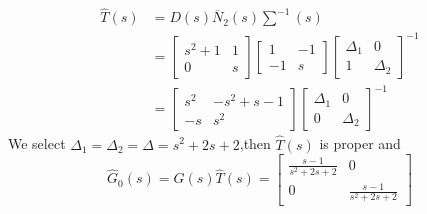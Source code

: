 \documentclass{article}
\begin{document}
\[
\begin{split}
\hat{T}(s)
& =D(s)\overline{N}_2(s)\sum^{-1}(s)\\
& =\left[
    \begin{array}{cc}
        s^2+1 & 1\\
        0 & s
    \end{array}
\right]\left[ 
    \begin{array}{cc}
        1 & -1\\
        -1 & s
    \end{array}
\right]
\left[
    \begin{array}{cc}
        \Delta_1 & 0\\
        1 & \Delta_2
    \end{array}
\right]^{-1}\\
& =\left[
    \begin{array}{cc}
        s^2 & -s^2+s-1\\
        -s & s^2
    \end{array}
\right]\left[
    \begin{array}{cc}
        \Delta_1 & 0\\
        0 & \Delta_2
    \end{array}
\right]^{-1}
\end{split}
\]
We select $\Delta_1=\Delta_2=\Delta=s^2+2s+2$,then $\hat{T}(s)$ is proper and
\[
\hat{G}_0(s)=\hat{G}(s)\hat{T}(s)=
\left[
    \begin{array}{cc}
        \frac{s-1}{s^2+2s+2} & 0\\
        0 & \frac{s-1}{s^2+2s+2}
    \end{array}
\right]    
\]
\end{document}
